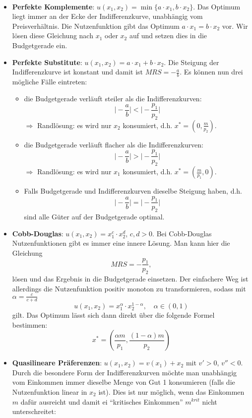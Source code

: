 \begin{kr}[Optimalität] ~\
	\begin{itemize}
		\item \textbf{Perfekte Komplemente}: $u(x_1, x_2) = \min \{ a \cdot x_1, b \cdot x_2 \}$. Das Optimum liegt immer an der Ecke der Indifferenzkurve, unabhängig vom Preisverhältnis. Die Nutzenfunktion gibt das Optimum $a \cdot x_1 = b \cdot x_2$ vor. Wir lösen diese Gleichung nach $x_1$ oder $x_2$ auf und setzen dies in die Budgetgerade ein.
		\item \textbf{Perfekte Substitute}: $u(x_1, x_2) = a \cdot x_1 + b \cdot x_2$. Die Steigung der Indifferenzkurve ist konstant und damit ist $MRS = - \frac{a}{b}$. Es können nun drei mögliche Fälle eintreten:
			\begin{itemize}
				\item die Budgetgerade verläuft steiler als die Indifferenzkurven: 
					$$ \big| - \frac{a}{b} \big| < \big| - \frac{p_1}{p_2} \big| $$
					$\Rightarrow$ Randlösung: es wird nur $x_2$ konsumiert, d.h. $x^* = (0, \frac{m}{p_2})$.
				\item die Budgetgerade verläuft flacher als die Indifferenzkurven: 
					$$ \big| - \frac{a}{b} \big| > \big| - \frac{p_1}{p_2} \big| $$
					$\Rightarrow$ Randlösung: es wird nur $x_1$ konsumiert, d.h. $x^* = (\frac{m}{p_1}, 0)$.
				\item Falls Budgetgerade und Indifferenzkurven dieselbe Steigung haben, d.h. 
					$$ \big| - \frac{a}{b} \big| = \big| - \frac{p_1}{p_2} \big| $$
					sind alle Güter auf der Budgetgerade optimal.
			\end{itemize}
		\item \textbf{Cobb-Douglas}: $u(x_1, x_2) = x_1^c \cdot x_2^d$, $c, d > 0$. Bei Cobb-Douglas Nutzenfunktionen gibt es immer eine innere Lösung. Man kann hier die Gleichung
			$$ MRS = - \frac{p_1}{p_2}, $$
			lösen und das Ergebnis in die Budgetgerade einsetzen. Der einfachere Weg ist allerdings die Nutzenfunktion positiv monoton zu transformieren, sodass mit $\alpha = \frac{c}{c + d}$
				$$ u(x_1, x_2) = x_1^{\alpha} \cdot x_2^{1 - \alpha}, \quad \alpha \in (0, 1) $$
			gilt. Das Optimum lässt sich dann direkt über die folgende Formel bestimmen:
			$$ x^* = \left( \frac{\alpha m}{p_1}, \frac{(1 - \alpha) m}{p_2} \right) $$
		\item \textbf{Quasilineare Präferenzen}: $u(x_1, x_2) = v(x_1) + x_2$ mit $v' > 0$, $v'' < 0$. Durch die besondere Form der Indifferenzkurven möchte man unabhängig vom Einkommen immer dieselbe Menge von Gut 1 konsumieren (falls die Nutzenfunktion linear in $x_2$ ist). Dies ist nur möglich, wenn das Einkommen $m$ dafür ausreicht und damit ei \enquote{kritisches Einkommen} $m^{krit}$ nicht unterschreitet:

\end{itemize}
\end{kr}
